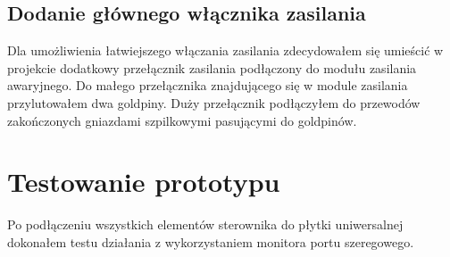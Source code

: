 \documentclass[11pt]{report}
\begin{document}
 \subsection{Dodanie głównego włącznika zasilania}
 Dla umożliwienia łatwiejszego włączania zasilania zdecydowałem się umieścić w projekcie dodatkowy przełącznik zasilania podłączony do modułu zasilania awaryjnego. Do małego przełącznika znajdującego się w module zasilania przylutowałem dwa goldpiny. Duży przełącznik podłączyłem do przewodów zakończonych gniazdami szpilkowymi pasującymi do goldpinów.

 \section{Testowanie prototypu}
 Po podłączeniu wszystkich elementów sterownika do płytki uniwersalnej dokonałem testu działania z wykorzystaniem monitora portu szeregowego.
 
\end{document}
